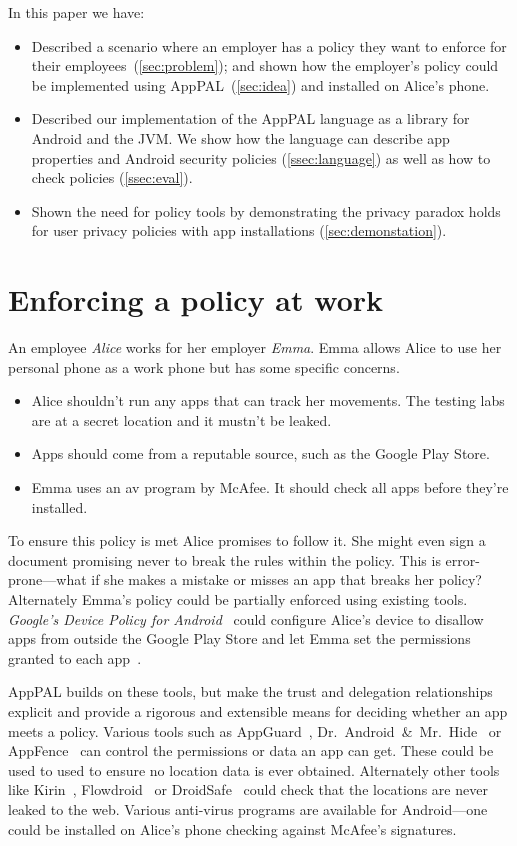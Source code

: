 \documentclass[]{llncs}
\begin{document}
\noindent
In this paper we have:
\begin{itemize}
  \item
    Described a scenario where an employer has a policy they want to enforce for their employees~(\autoref{sec:problem});
    and shown how the employer's policy could be implemented using AppPAL~(\autoref{sec:idea}) and installed on Alice's phone.
  \item
    Described our implementation of the AppPAL language as a library for Android and the JVM.
    We show how the language can describe app properties and Android security policies (\autoref{ssec:language}) as well as how to check policies (\autoref{ssec:eval}).
  \item
    Shown the need for policy tools by demonstrating the privacy paradox holds for user privacy policies with app installations (\autoref{sec:demonstation}).
\end{itemize}

\section{Enforcing a policy at work}
\label{sec:problem}

An employee \emph{Alice} works for her employer \emph{Emma}.
Emma allows Alice to use her personal phone as a work phone but has some specific concerns.
\begin{itemize}
  \item Alice shouldn't run any apps that can track her movements.
    The testing labs are at a secret location and it mustn't be leaked.
  \item Apps should come from a reputable source, such as the Google Play Store.
  \item Emma uses an \ac{av} program by McAfee.
    It should check all apps before they're installed.
\end{itemize}

To ensure this policy is met Alice promises to follow it.
She might even sign a document promising never to break the rules within the policy.
This is error-prone---what if she makes a mistake or misses an app that breaks her policy?
Alternately Emma's policy could be partially enforced using existing tools.
\emph{Google's Device Policy for Android}~\cite{GoogleAppsDeviceP:tz} could configure Alice's device to disallow apps from outside the Google Play Store and let Emma set the permissions granted to each app~\cite{AndroidMPermission:2015uq}.

AppPAL builds on these tools, but make the trust and delegation relationships explicit and provide a rigorous and extensible means for deciding whether an app meets a policy.
Various tools such as AppGuard~\cite{Backes:2012vm}, Dr.~Android~\&~Mr.~Hide~\cite{Jeon:2012ki} or AppFence~\cite{Hornyack:2011wq} can control the permissions or data an app can get.
These could be used to used to ensure no location data is ever obtained.
Alternately other tools like Kirin~\cite{Enck:2009ko}, Flowdroid~\cite{Fritz:2013vi} or DroidSafe~\cite{Gordon:2015et} could check that the locations are never leaked to the web.
Various anti-virus programs are available for Android---one could be installed on Alice's phone checking against McAfee's signatures.
\end{document}

